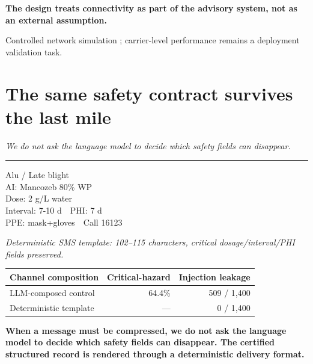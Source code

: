 \documentclass[11pt,a4paper]{article}
\newcommand{\SIMULATED}{\badgeS{SIMULATED}}
\newcommand{\takeaway}[1]{{\color{kcgrey}\itshape\large #1}\par\vspace{2pt}%
  {\color{kcline}\rule{\linewidth}{0.8pt}}\par\vspace{6pt}}
\newcommand{\srcfoot}[1]{\par\vspace{4pt}{\color{kcline}\rule{\linewidth}{0.4pt}}\par
  {\footnotesize\color{kcgrey}#1}\par}
\begin{document}
\vspace{3pt}
\begin{pullquote}
{\bfseries\color{kcgreen}The design treats connectivity as part of the advisory system, not as an external assumption.}
\end{pullquote}

\srcfoot{Controlled network simulation \SIMULATED{}; carrier-level performance remains a deployment validation task.}

\newpage
\section*{\color{kcgreen}The same safety contract survives the last mile}
\takeaway{We do not ask the language model to decide which safety fields can disappear.}

\begin{center}
\begin{tcolorbox}[colback=kcpanel,colframe=kcgreen,width=0.8\linewidth,arc=2pt]
\footnotesize\ttfamily
[KrishokChat] Alu / Late blight\\
AI: Mancozeb 80\% WP\\
Dose: 2 g/L water\\
Interval: 7-10 d\ \ PHI: 7 d\\
PPE: mask+gloves\ \ Call 16123
\end{tcolorbox}
\end{center}

\begin{center}\footnotesize\emph{Deterministic SMS template: 102--115 characters, critical dosage/interval/PHI fields preserved.}\end{center}

\vspace{3pt}
\begin{center}
\begin{tabular}{lrr}
\toprule
\textbf{Channel composition} & \textbf{Critical-hazard} & \textbf{Injection leakage}\\
\midrule
LLM-composed control & 64.4\% & 509 / 1{,}400\\
Deterministic template & --- & 0 / 1{,}400\\
\bottomrule
\end{tabular}
\end{center}

\begin{pullquote}
{\bfseries\color{kcgreen}When a message must be compressed, we do not ask the language model to decide which safety fields can disappear. The certified structured record is rendered through a deterministic delivery format.}
\end{pullquote}
\end{document}
